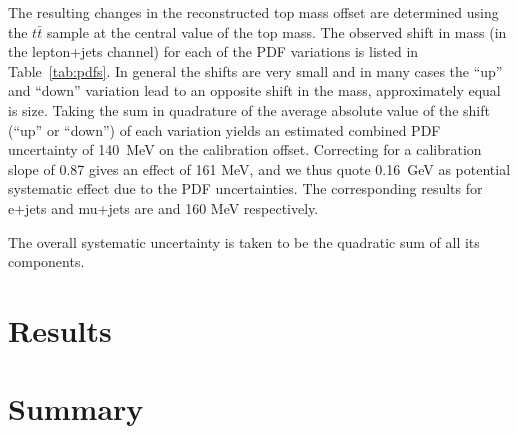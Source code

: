 \begin{description}[wide=\parindent]
The resulting changes in the reconstructed top mass offset are determined using the  $t \bar t$ sample at the central
value of the top mass. The observed shift in mass (in the lepton+jets channel) for each of the PDF variations is
listed in Table~\ref{tab:pdfs}. In general the shifts are very small and in many cases the ``up'' and ``down''
variation lead to an opposite shift in the mass, approximately equal is size. Taking the sum in quadrature of the
average absolute value of the shift (``up'' or ``down'') of each variation yields an estimated combined PDF
uncertainty of 140~MeV on the calibration offset. Correcting for a calibration slope of 0.87 gives an effect of 161
MeV, and we thus quote 0.16~GeV as potential systematic effect due to the PDF uncertainties. The corresponding results
for e+jets and mu+jets are and 160 MeV respectively.


\end{description}

The overall systematic uncertainty is taken to be the quadratic sum of all its components.


\section{Results}
\label{s_top_mass:results}

\section{Summary}
\label{s_top_mass:summary}




